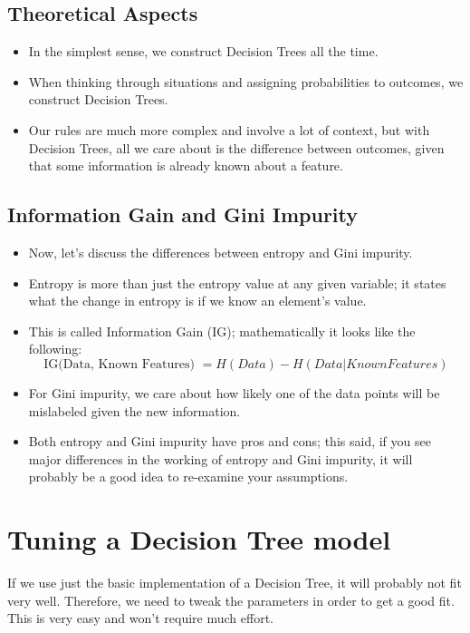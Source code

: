 \documentclass[SKL-MASTER.tex]{subfiles}
\begin{document}
\subsection*{Theoretical Aspects}
\begin{itemize}

\item In the simplest sense, we construct Decision Trees all the time. 
\item When thinking through
situations and assigning probabilities to outcomes, we construct Decision Trees. 
\item Our rules
are much more complex and involve a lot of context, but with Decision Trees, all we care
about is the difference between outcomes, given that some information is already known
about a feature.
\end{itemize}

\subsection*{Information Gain and Gini Impurity}
\begin{itemize}
\item Now, let's discuss the differences between entropy and Gini impurity.
\item Entropy is more than just the entropy value at any given variable; it states what the change in
entropy is if we know an element's value. 
\item This is called Information Gain (IG); mathematically
it looks like the following:
\[\mbox{IG(Data, Known Features) }= H (Data)- H (Data|Known Features)\]
\item For Gini impurity, we care about how likely one of the data points will be mislabeled given the
new information.

\item Both entropy and Gini impurity have pros and cons; this said, if you see major differences
in the working of entropy and Gini impurity, it will probably be a good idea to re-examine
your assumptions.
\end{itemize}

\newpage
\section*{Tuning a Decision Tree model}
If we use just the basic implementation of a Decision Tree, it will probably not fit very well.
Therefore, we need to tweak the parameters in order to get a good fit. This is very easy and
won't require much effort.
\end{document}
